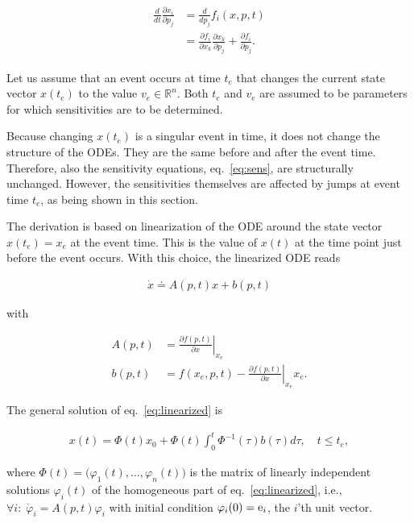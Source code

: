 \documentclass[journal, a4paper]{IEEEtran}
\begin{document}
\begin{align}
\begin{aligned}
    \frac{d}{dt}\frac{\partial x_i}{\partial p_j} &= \frac{d}{dp_j} f_i(x, p, t)\\
        & = \frac{\partial f_i}{\partial x_k}\frac{\partial x_k}{\partial p_j} +
            \frac{\partial f_i}{\partial p_j}.
\end{aligned}
 \label{eq:sens}
\end{align}

Let us assume that an event occurs at time $t_e$ that changes the
current state vector $x(t_e)$ to the value $v_e \in \mathbb R^n$. Both
$t_e$ and $v_e$ are assumed to be parameters for which sensitivities
are to be determined.

Because changing $x(t_e)$ is a singular event in time, it does not
change the structure of the ODEs. They are the same before and after
the event time. Therefore, also the sensitivity equations,
eq.~\eqref{eq:sens}, are structurally unchanged. However, the
sensitivities themselves are affected by jumps at event time $t_e$, as
being shown in this section.

The derivation is based on linearization of the ODE around the state
vector $x(t_e) = x_e$ at the event time.  This is the value of $x(t)$
at the time point just before the event occurs. With this choice,
the linearized ODE reads

\begin{align}
    \dot x \doteq A(p, t) x + b(p, t)
    \label{eq:linearized}
\end{align}

with

\begin{align*}
A(p, t) &= \left.\frac{\partial f(p, t)}{\partial x}\right|_{x_e}\\
b(p, t) &= f(x_e, p, t)- \left.\frac{\partial f(p, t)}{\partial x}\right|_{x_e}x_e.
\end{align*}

The general solution of eq.~\eqref{eq:linearized} is

\begin{align}
    x(t) = \Phi(t)x_0 + \Phi(t)\int_0^t \Phi^{-1}(\tau)b(\tau)d\tau,\quad t\leq t_e,
    \label{eq:leqte}
\end{align}

where $\Phi(t) = \big(\varphi_1(t), \dots, \varphi_n(t)\big)$ is the
matrix of linearly independent solutions $\varphi_i(t)$ of the
homogeneous part of eq.~\eqref{eq:linearized}, i.e., $\forall
i:\;\dot\varphi_i = A(p, t)\varphi_i$ with initial condition
$\varphi_i(0) = {\rm e}_i$, the $i$'th unit vector.
\end{document}
